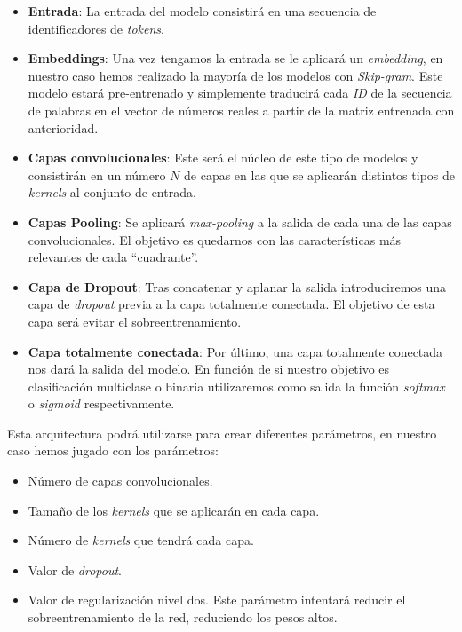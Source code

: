 \begin{itemize}
\item \textbf{Entrada}: La entrada del modelo consistirá en una secuencia de identificadores de \textit{tokens}.

 \item \textbf{Embeddings}: Una vez tengamos la entrada se le aplicará un \textit{embedding}, en nuestro caso hemos realizado la mayoría de los modelos con \textit{Skip-gram}. Este modelo estará pre-entrenado y simplemente traducirá cada \textit{ID} de la secuencia de palabras en el vector de números reales a partir de la matriz entrenada con anterioridad. 
 
 \item \textbf{Capas convolucionales}: Este será el núcleo de este tipo de modelos y consistirán en un número $N$ de capas en las que se aplicarán distintos tipos de \textit{kernels} al conjunto de entrada.
 
 
 \item \textbf{Capas Pooling}: Se aplicará \textit{max-pooling} a la salida de cada una de las capas convolucionales. El objetivo es quedarnos con las características más relevantes de cada ``cuadrante''.
 
 
 \item \textbf{Capa de Dropout}: Tras concatenar y aplanar la salida introduciremos una capa de \textit{dropout} previa a la capa totalmente conectada. El objetivo de esta capa será evitar el sobreentrenamiento. 
 
   \item \textbf{Capa totalmente conectada}: Por último, una capa totalmente conectada nos dará la salida del modelo. En función de si nuestro objetivo es clasificación multiclase o binaria utilizaremos como salida la función \textit{softmax} o \textit{sigmoid} respectivamente.
 
 
 
\end{itemize}

Esta arquitectura podrá utilizarse para crear diferentes parámetros, en nuestro caso hemos jugado con los parámetros: 

\begin{itemize}
\item Número de capas convolucionales. 
\item Tamaño de los \textit{kernels} que se aplicarán en cada capa.
\item Número de \textit{kernels} que tendrá cada capa. 
\item Valor de \textit{dropout}.
\item Valor de regularización nivel dos. Este parámetro intentará reducir el sobreentrenamiento de la red, reduciendo los pesos altos. 
\end{itemize}



